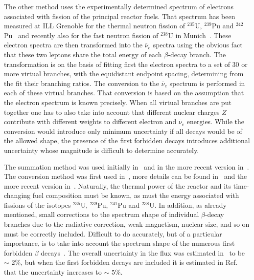 \documentclass[aps,twocolumn,preprintnumbers,amsmath,superscriptaddress,amssymb,floats,nofootinbib]{revtex4-1}
\begin{document}
 The other method uses the experimentally determined spectrum of electrons associated with fission of the principal reactor fuels. That spectrum has been
 measured at ILL Grenoble for the thermal neutron fission of $^{235}$U, $^{239}$Pu and $^{242}$Pu~\cite{vonFeilitzsch,Schreckenbach,Hahn} and recently also for the fast neutron fission of $^{238}$U
 in Munich~\cite{Haag}. These electron spectra are then transformed into the $\bar{\nu}_e$ spectra using the obvious fact that these two leptons share the total energy
 of each $\beta$-decay branch. The transformation is on the basis of fitting first the electron spectra to a set of 30 or more virtual branches, with the equidistant
 endpoint spacing, determining from the fit their branching ratios.
 The conversion to the $\bar{\nu}_e$ spectrum is performed in each of these virtual branches. That conversion is based on the assumption
 that the electron spectrum is known precisely.
 When all virtual branches are put together one has to also take into account that different nuclear charges $Z$
 contribute with different weights to different electron
 and $\bar{\nu}_e$ energies.
 While the conversion would introduce only minimum uncertainty if all decays would be of the allowed shape, the presence
 of the first forbidden decays introduces additional uncertainty whose magnitude is difficult to determine accurately.

The summation method was used
initially in~\cite{Davis,Vogel81,Klapdor-Pu,Klapdor-U,Kopeikin} and in the more recent version in~\cite{Mueller}.
The conversion method was first used in~\cite{vonFeilitzsch,Schreckenbach,Hahn}, more details can be found in~\cite{Vogel07} and the more recent version in~\cite{Huber}.
Naturally, the thermal power of the reactor and its time-changing fuel composition must be known, as must the
energy associated with fissions of the isotopes $^{235}$U, $^{239}$Pu, $^{241}$Pu
and $^{238}$U. In addition, as already mentioned, small corrections to the spectrum shape of individual $\beta$-decay branches due to the radiative correction, weak magnetism,
nuclear size, and so on must be correctly included. Difficult to do accurately, but of a particular importance, is to take into account the spectrum shape of the numerous
first forbidden $\beta$ decays~\cite{Hayes}. The overall uncertainty in the flux was estimated in~\cite{Mueller, Huber} to be $\sim$ 2\%, but when the
first forbidden decays are included it is estimated in Ref.~\cite{Hayes} that the uncertainty increases to $\sim$ 5\%.
\end{document}
